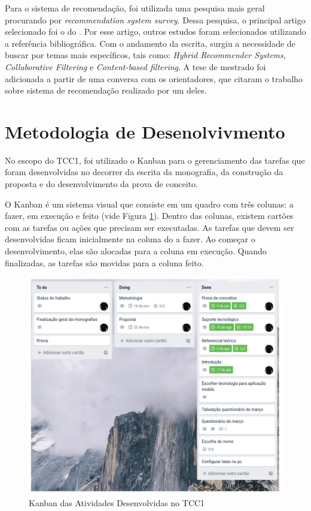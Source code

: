Para o sistema de recomendação, foi utilizada uma pesquisa mais geral procurando por \emph{recommendation system survey}. Dessa pesquisa, o principal artigo selecionado foi o 
do . Por esse artigo, outros estudos foram selecionados utilizando a referência bibliográfica. Com o andamento da escrita, surgiu a necessidade de buscar
por temas mais específicos, tais como: \emph{Hybrid Recommender Systems}, \emph{Collaborative Filtering} e \emph{Content-based filtering}. A tese de mestrado \cite{mauricio} foi adicionada a partir 
de uma conversa com os orientadores, que citaram o trabalho sobre sistema de recomendação realizado por um deles.


\section{Metodologia de Desenolvivmento}

No escopo do TCC1, foi utilizado o Kanban para o gerenciamento das tarefas que foram 
desenvolvidas no decorrer da escrita da monografia, da construção da proposta e do desenvolvimento 
da prova de conceito.

O Kanban é um sistema visual que consiste em um quadro com três colunas: a fazer, em execução e feito (vide Figura \ref{fig04}). 
Dentro das colunas, existem cartões com as tarefas ou ações que precisam ser executadas. As tarefas que devem 
ser desenvolvidas ficam inicialmente na coluna do a fazer. Ao começar o desenvolvimento, elas são alocadas para a coluna 
em execução. Quando finalizadas, as tarefas são movidas para a coluna feito.

\begin{figure}[h]
	\centering
	\includegraphics[keepaspectratio=true,scale=0.6]{figuras/kanban.pdf}
	\caption{Kanban das Atividades Desenvolvidas no TCC1 }
        \label{fig04}
\end{figure}

